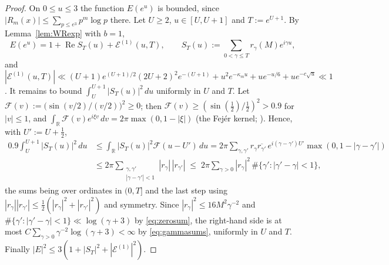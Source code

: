 \documentclass[11pt]{amsart}
\theoremstyle{definition}
\numberwithin{equation}{section}
\newcommand{\cE}{\mathcal E}
\newcommand{\re}{\operatorname{Re}}
\begin{document}
\begin{proof}
On $0\le u\le3$ the function $E(e^u)$ is bounded, since
$|R_m(x)|\le\sum_{p\le e^3}p^m\log p$ there. Let $U\ge2$,
$u\in[U,U+1]$ and $T:=e^{U+1}$. By Lemma~\ref{lem:WRexp} with $b=1$,
\[
E(e^u)=1+\re S_T(u)+\cE^{(1)}(u,T),\qquad
S_T(u):=\sum_{0<\gamma\le T}r_\gamma(M)e^{i\gamma u},
\]
and $|\cE^{(1)}(u,T)|\ll(U+1)e^{(U+1)/2}(2U+2)^2e^{-(U+1)}
+u^2e^{-\kappa_mu}+ue^{-u/6}+ue^{-c\sqrt u}\ll1$. It remains to bound
$\int_U^{U+1}|S_T(u)|^2\,du$ uniformly in $U$ and $T$. Let
$\mathcal F(v):=\bigl(\sin(v/2)/(v/2)\bigr)^2\ge0$; then
$\mathcal F(v)\ge(\sin(\tfrac12)/\tfrac12)^2>0.9$ for $|v|\le1$, and
$\int_{\mathbb R}\mathcal F(v)e^{i\xi v}\,dv=2\pi\max(0,1-|\xi|)$
(the Fej\'er kernel; \cite[Ch.~XV, \S2]{Fel71}). Hence, with
$U':=U+\tfrac12$,
\begin{align*}
0.9\int_U^{U+1}|S_T(u)|^2\,du
&\le\int_{\mathbb R}|S_T(u)|^2\mathcal F(u-U')\,du
=2\pi\sum_{\gamma,\gamma'}r_\gamma\overline{r_{\gamma'}}\,
e^{i(\gamma-\gamma')U'}\max(0,1-|\gamma-\gamma'|)\\
&\le2\pi\sum_{\substack{\gamma,\gamma'\\|\gamma-\gamma'|<1}}
|r_\gamma|\,|r_{\gamma'}|
\;\le\;2\pi\sum_{\gamma>0}|r_\gamma|^2\,\#\{\gamma':|\gamma'-\gamma|<1\},
\end{align*}
the sums being over ordinates in $(0,T]$ and the last step using
$|r_\gamma||r_{\gamma'}|\le\tfrac12(|r_\gamma|^2+|r_{\gamma'}|^2)$ and
symmetry. Since $|r_\gamma|^2\le16M^2\gamma^{-2}$ and
$\#\{\gamma':|\gamma'-\gamma|<1\}\ll\log(\gamma+3)$ by
\eqref{eq:zerosum}, the right-hand side is at most
$C\sum_{\gamma>0}\gamma^{-2}\log(\gamma+3)<\infty$ by
\eqref{eq:gammasums}, uniformly in $U$ and $T$. Finally
$|E|^2\le3(1+|S_T|^2+|\cE^{(1)}|^2)$.
\end{proof}
\end{document}
